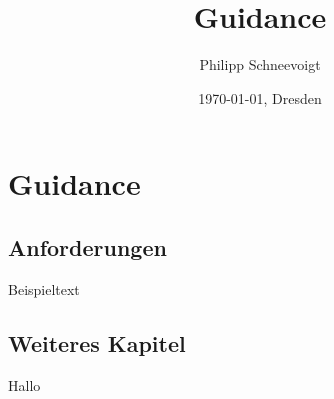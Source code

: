 \documentclass[../documentation.tex]{subfiles}
\title{Guidance}
\author{Philipp Schneevoigt}
\date{\today{}, Dresden}
\begin{document}
\onlyinsubfile{\maketitle\tableofcontents}
\section{Guidance}

\subsection{Anforderungen}
\label{sec:anforderungen}

Beispieltext

\subsection{Weiteres Kapitel}
\label{sec:weitereskapitel}

Hallo
\end{document}
